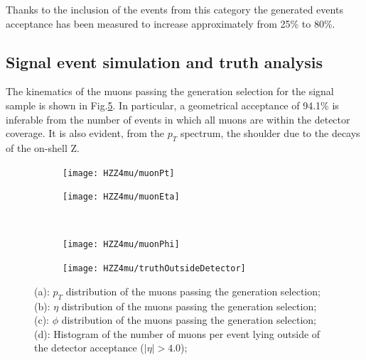 \documentclass[a4paper,twoside,12pt]{article}
\begin{document}
Thanks to the inclusion of the events from this category the generated events acceptance has been measured to increase approximately from 25\% to 80\%.\\

\subsection{Signal event simulation and truth analysis}

The kinematics of the muons passing the generation selection for the 
signal sample is shown in 
Fig.\ref{fig:HZZ4mu:muonKinematics}. In particular, a geometrical acceptance of 94.1\%
is inferable from the number of events in which all muons are within the detector
coverage. It is also evident, from the $p_{T}$ spectrum, the shoulder due to the decays
of the on-shell Z.\\


\begin{figure}
\begin{subfigure}{.5\linewidth}
\texttt{[image: HZZ4mu/muonPt]}
\caption{}
\label{fig:HZZ4mu:pt}
\end{subfigure}
\begin{subfigure}{.5\linewidth}
\centering
\texttt{[image: HZZ4mu/muonEta]}
\caption{}
\label{fig:HZZ4mu:eta}
\end{subfigure}\\[1 ex]
\begin{subfigure}{.5\linewidth}
\centering
\texttt{[image: HZZ4mu/muonPhi]}
\caption{}
\label{fig:HZZ4mu:phi}
\end{subfigure}
\begin{subfigure}{.5\linewidth}
\centering
\texttt{[image: HZZ4mu/truthOutsideDetector]}
\caption{}
\label{fig:HZZ4mu:truthOutsideDetector}
\end{subfigure}
\caption{(a): $p_T$ distribution of the muons passing the generation selection;\\
	        (b): $\eta$ distribution of the muons passing the generation selection;\\
        	        (c): $\phi$ distribution of the muons passing the generation selection;\\
         	        (d): Histogram of the number of muons per event lying outside of the detector acceptance
         	        	($|\eta| > 4.0$);\\
        	        }
\label{fig:HZZ4mu:muonKinematics}
\end{figure}
\end{document}
